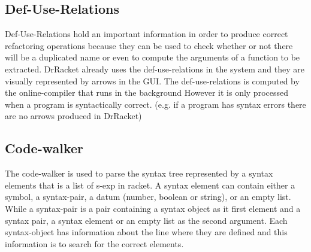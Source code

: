 \subsection{Def-Use-Relations}
Def-Use-Relations hold an important information in order to produce correct refactoring operations %
because they can be used to check whether or not there will be a duplicated name
or even to compute the arguments of a function to be extracted.
DrRacket already uses the def-use-relations in the system and they are visually  %
represented by arrows in the GUI.
The def-use-relations is computed by the online-compiler that runs in the background
However it is only processed when a program is syntactically correct. (e.g. if
a program has syntax errors there are no arrows produced in DrRacket)

\subsection{Code-walker}
The code-walker is used to parse the syntax tree represented by a syntax elements
that is a list of s-exp in racket. %
A syntax element can contain either a symbol, a syntax-pair, a datum (number, boolean or string),
or an empty list. %
While a syntax-pair is a pair containing a syntax object as it first element and
a syntax pair, a syntax element or an empty list as the second argument.
Each syntax-object has information about the line where they are defined and this
information is to search for the correct elements.


